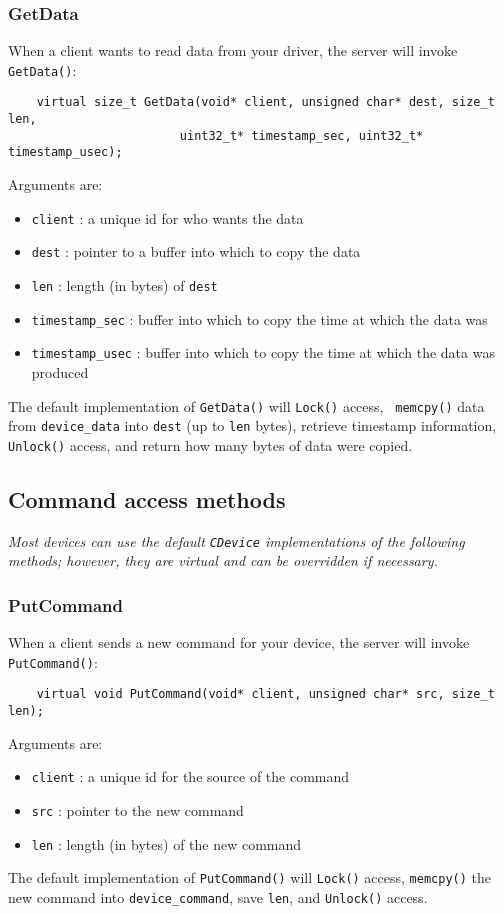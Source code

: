 \documentclass[11pt]{report}
\begin{document}
\subsubsection{GetData}
When a client wants to read data from your driver, the server will 
invoke {\tt GetData()}:
\begin{verbatim}
    virtual size_t GetData(void* client, unsigned char* dest, size_t len,
                        uint32_t* timestamp_sec, uint32_t* timestamp_usec);
\end{verbatim}
Arguments are:
\begin{itemize}
\item {\tt client} : a unique id for who wants the data
\item {\tt dest} : pointer to a buffer into which to copy the data
\item {\tt len} : length (in bytes) of {\tt dest}
\item {\tt timestamp\_sec} : buffer into which to copy the time at which the data was 
\item {\tt timestamp\_usec} : buffer into which to copy the time at which the data was 
produced
\end{itemize}
The default implementation of {\tt GetData()} will {\tt Lock()} access, {\tt
memcpy()} data from {\tt device\_data} into {\tt dest} (up to {\tt len}
bytes), retrieve timestamp information, {\tt Unlock()} access, and return 
how many bytes of data were copied.

\subsection{Command access methods}
{\em Most devices can use the default {\tt CDevice} implementations of the
following methods; however, they are virtual and can be overridden if
necessary.}

\subsubsection{PutCommand}
When a client sends a new command for your device, the server will
invoke {\tt PutCommand()}:
\begin{verbatim}
    virtual void PutCommand(void* client, unsigned char* src, size_t len);
\end{verbatim}
Arguments are:
\begin{itemize}
\item {\tt client} : a unique id for the source of the command
\item {\tt src} : pointer to the new command
\item {\tt len} : length (in bytes) of the new command
\end{itemize}
The default implementation of {\tt PutCommand()} will {\tt Lock()} access,
{\tt memcpy()} the new command into {\tt device\_command}, save {\tt len},
and {\tt Unlock()} access.
\end{document}
